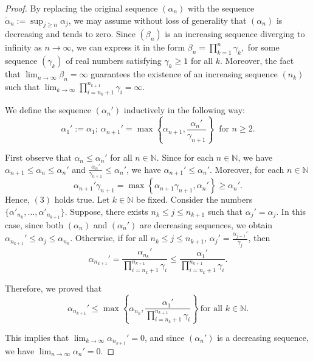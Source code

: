 \documentclass[10pt]{amsart}
\theoremstyle{definition}
\theoremstyle{myremark}
\numberwithin{equation}{section}
\def\N{\mathbb N}
\begin{document}
\begin{proof}
    By replacing the original sequence $(\alpha_n)$ with the sequence $\tilde{\alpha}_n := \sup_{j \geq n} \alpha_j$, we may assume without loss of generality that $(\alpha_n)$ is decreasing and tends to zero. Since $(\beta_n)$ is an increasing sequence diverging to infinity as $n \to \infty$, we can express it in the form  
    $  \beta_n = \prod_{k=1}^n \gamma_k,
    $  
    for some sequence $(\gamma_k)$ of real numbers satisfying $\gamma_k \geq 1$ for all $k$. Moreover, the fact that  
    $\lim_{n \to \infty} \beta_n = \infty
    $  
    guarantees the existence of an increasing sequence $(n_k)$ such that 
    $   \lim_{k \to \infty} \prod_{i=n_k+1}^{n_{k+1}} \gamma_i = \infty$.

    
   We define the sequence $(\alpha_n')$ inductively in the following way:  
    \[
    \alpha_1':= \alpha_1;~ \alpha_{n+1}'= \max \left\{\alpha_{n+1}, \frac{\alpha_{n}'}{\gamma_{n+1}}\right\}~ \text{ for } n \geq 2.
    \]
    
    First observe that $\alpha_n \leq \alpha_n'$ for all $n \in \N$. Since for each $n \in \N$, we have $\alpha_{n+1} \leq \alpha_n \leq \alpha_n'$ and $\frac{\alpha_{n}'}{\gamma_{n+1}} \leq \alpha_n'$, we have $\alpha_{n+1}' \leq \alpha_n'$. Moreover, for each $n \in \N$
    \[
    \alpha_{n+1}' \gamma_{n+1}= \max \left\{ \alpha_{n+1} \gamma_{n+1}, \alpha_n' \right\} \geq \alpha_n'.
    \]
    Hence, $(3)$ holds true.
    Let $k \in \N$ be fixed. Consider the numbers $\{ \alpha'_{n_k}, \ldots, \alpha'_{n_{k+1}}  \}$. Suppose, there exists $n_k \leq j \leq n_{k+1}$ such that $\alpha_j'= \alpha_{j}$. In this case, since both $(\alpha_n)$ and $(\alpha_n')$ are decreasing sequences, we obtain $\alpha_{n_{k+1}}' \leq \alpha_j \leq \alpha_{n_k}$. Otherwise, if for all $n_k \leq j \leq n_{k+1}$, $\alpha_j'= \frac{\alpha_{j-1}'}{\gamma_j}$, then 
    \[
    \alpha_{n_{k+1}}'= \frac{\alpha_{n_k}'}{\prod_{i=n_k+1}^{n_{k+1}} \gamma_i} \leq \frac{\alpha_1'}{\prod_{i=n_k+1}^{n_{k+1}} \gamma_i}.
    \]

    Therefore, we proved that 
    \[
    \alpha_{n_{k+1}}' \leq \max \left\{ \alpha_{n_k}, \frac{\alpha_1'}{\prod_{i=n_k+1}^{n_{k+1}} \gamma_i} \right\}~ \text{for all } k \in \N.
    \]

    This implies that $\lim_{k \to \infty} \alpha_{n_{k+1}}'=0$, and since $(\alpha_n')$ is a decreasing sequence, we have $\lim_{n \to \infty} \alpha_n'=0$.
\end{proof}
\end{document}
